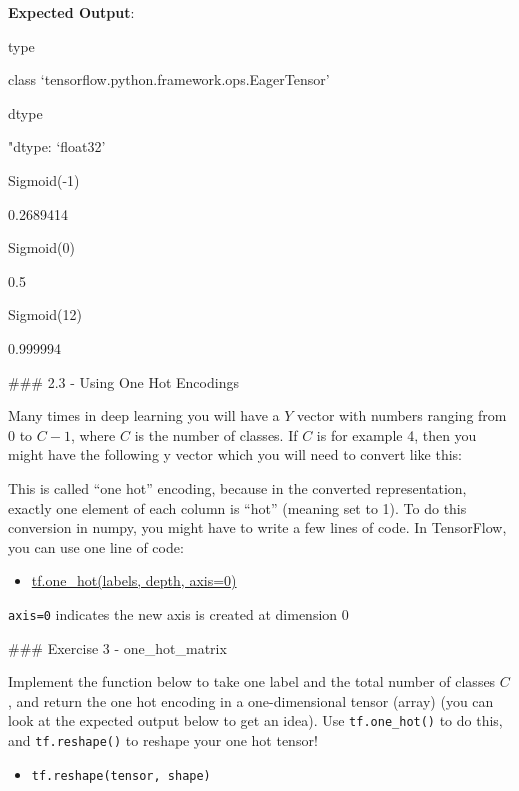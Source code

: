 \documentclass[11pt]{article}
\providecommand{\tightlist}{%
      \setlength{\itemsep}{0pt}\setlength{\parskip}{0pt}}
\begin{document}
    \textbf{Expected Output}:

type

class `tensorflow.python.framework.ops.EagerTensor'

dtype

"dtype: `float32'

Sigmoid(-1)

0.2689414

Sigmoid(0)

0.5

Sigmoid(12)

0.999994

    \#\#\# 2.3 - Using One Hot Encodings

Many times in deep learning you will have a \(Y\) vector with numbers
ranging from \(0\) to \(C-1\), where \(C\) is the number of classes. If
\(C\) is for example 4, then you might have the following y vector which
you will need to convert like this:

This is called ``one hot'' encoding, because in the converted
representation, exactly one element of each column is ``hot'' (meaning
set to 1). To do this conversion in numpy, you might have to write a few
lines of code. In TensorFlow, you can use one line of code:

\begin{itemize}
\tightlist
\item
  \href{https://www.tensorflow.org/api_docs/python/tf/one_hot}{tf.one\_hot(labels,
  depth, axis=0)}
\end{itemize}

\texttt{axis=0} indicates the new axis is created at dimension 0

\#\#\# Exercise 3 - one\_hot\_matrix

Implement the function below to take one label and the total number of
classes \(C\), and return the one hot encoding in a one-dimensional
tensor (array) (you can look at the expected output below to get an
idea). Use \texttt{tf.one\_hot()} to do this, and \texttt{tf.reshape()}
to reshape your one hot tensor!

\begin{itemize}
\tightlist
\item
  \texttt{tf.reshape(tensor,\ shape)}
\end{itemize}
\end{document}
